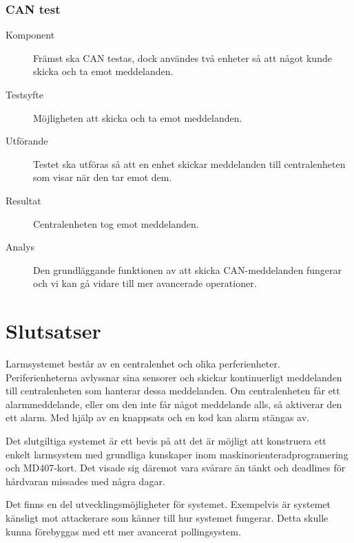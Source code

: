 \documentclass[a4paper]{article}
\begin{document}
\subsubsection{CAN test}
\begin{description}
\item[Komponent] Främst ska CAN testas, dock användes två enheter så att något kunde skicka och ta emot meddelanden.

\item[Testsyfte] Möjligheten att skicka och ta emot meddelanden.

\item[Utförande] Testet ska utföras så att en enhet skickar meddelanden till centralenheten som visar när den tar emot dem.

\item[Resultat] Centralenheten tog emot meddelanden.

\item[Analys] Den grundläggande funktionen av att skicka CAN-meddelanden fungerar och vi kan gå vidare till mer avancerade operationer.
\end{description}


\section{Slutsatser}

Larmsystemet består av en centralenhet och olika perferienheter. 
Periferienheterna avlyssnar sina sensorer och skickar kontinuerligt meddelanden till centralenheten som hanterar dessa meddelanden. 
Om centralenheten får ett alarmmeddelande, eller om den inte får något meddelande alls, så aktiverar den ett alarm. 
Med hjälp av en knappsats och en kod kan alarm stängas av.

Det slutgiltiga systemet är ett bevis på att det är möjligt att konstruera ett enkelt larmsystem med grundliga kunskaper inom maskinorienteradprogramering och MD407-kort. 
Det visade sig däremot vara svårare än tänkt och deadlines för hårdvaran missades med några dagar. 

Det finns en del utvecklingsmöjligheter för systemet. %
Exempelvis är systemet känsligt mot attackerare som känner till hur systemet fungerar. 
Detta skulle kunna förebyggas med ett mer avancerat pollingsystem.




\end{document}
